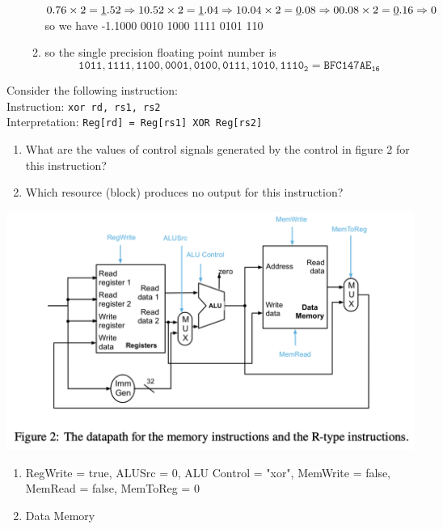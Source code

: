 \documentclass[12pt, a4paper]{article}
\begin{document}
\begin{ans}
\begin{enumerate}
\begin{enumerate}
\begin{math}
                        0.76 \times 2 = \underline{1}.52 \Rightarrow 1\\
                        0.52 \times 2 = \underline{1}.04 \Rightarrow 1 \hfill
                        0.04 \times 2 = \underline{0}.08 \Rightarrow 0 \hfill
                        0.08 \times 2 = \underline{0}.16 \Rightarrow 0
                    \end{math}\\
                    so we have -1.1000 0010 1000 1111 0101 110
                \item so the single precision floating point number is $$\mathtt{1 011,1111,1 100,0001,0100,0111,1010,1110_2 = BFC147AE_{16}}$$
            \end{enumerate}
    \end{enumerate}
\end{ans}
\pagebreak
\begin{q}{10}
Consider the following instruction:\\
Instruction: \texttt{xor rd, rs1, rs2}\\
Interpretation: \texttt{Reg[rd] = Reg[rs1] XOR Reg[rs2]}
\begin{enumerate}
    \item What are the values of control signals generated by the control in figure 2 for this
    instruction?
    \item Which resource (block) produces no output for this instruction?
\end{enumerate}
\begin{center}
    \includegraphics[scale=0.65]{q3.png}
\end{center}
\end{q}
\begin{ans}
    \begin{enumerate}
        \item RegWrite = true, ALUSrc = 0, ALU Control = "xor", MemWrite = false, \\MemRead = false, MemToReg = 0 
        \item Data Memory
    \end{enumerate}
\end{ans}
\end{document}
